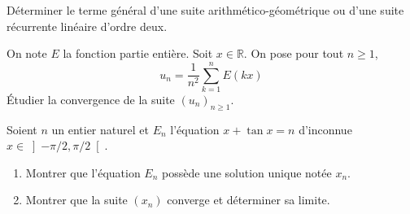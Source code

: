 \documentclass[twoside,a4paper,french,10pt]{VcCours}
\begin{document}
\begin{Exercice}{}
  Déterminer le terme général d'une suite arithmético-géométrique ou d'une suite récurrente linéaire d'ordre deux.
\end{Exercice}

\begin{Exercice}{}
  On note $E$ la fonction partie entière. Soit $x \in \mathbb{R}$. On pose pour tout $n \geq 1$, 
  $$ u_n = \frac{1}{n^2} \sum_{k=1}^n E(kx)$$
  Étudier la convergence de la suite $(u_n)_{n \geq 1}$.
\end{Exercice}

\begin{Exercice}{}
  Soient $n$ un entier naturel et $E_n $ l'équation $x + \tan x = n$ d'inconnue $x \in \left] { - \pi  / 2,\pi  / 2} \right[$.
  \begin{enumerate}
  \item Montrer que l'équation $E_n$ possède une solution unique notée $x_n $.
  \item Montrer que la suite $(x_n)$ converge et déterminer sa limite.
  \end{enumerate}
\end{Exercice}
\end{document}
